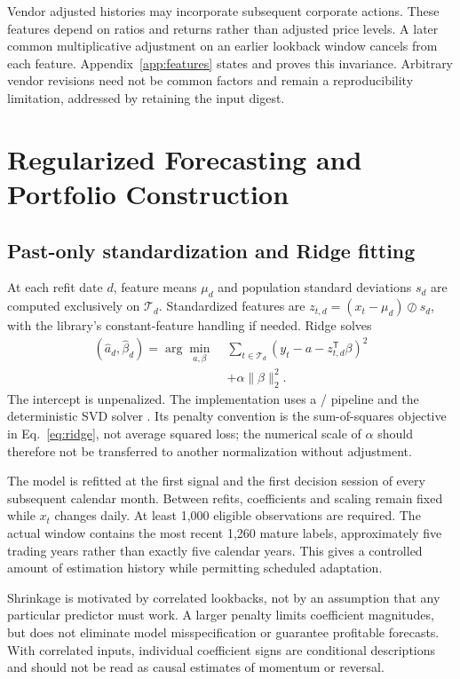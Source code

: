 Vendor adjusted histories may incorporate subsequent corporate actions. These features depend on ratios and returns rather than adjusted price levels. A later common multiplicative adjustment on an earlier lookback window cancels from each feature. Appendix~\ref{app:features} states and proves this invariance. Arbitrary vendor revisions need not be common factors and remain a reproducibility limitation, addressed by retaining the input digest.

\section{Regularized Forecasting and Portfolio Construction}
\label{sec:method}
\subsection{Past-only standardization and Ridge fitting}
At each refit date $d$, feature means $\mu_d$ and population standard deviations $s_d$ are computed exclusively on $\mathcal T_d$. Standardized features are $z_{t,d}=(x_t-\mu_d)\oslash s_d$, with the library's constant-feature handling if needed. Ridge solves
\begin{align}
 (\widehat a_d,\widehat\beta_d)
 =\arg\min_{a,\beta}\;&\sum_{t\in\mathcal T_d}
 (y_t-a-z_{t,d}^{\mathsf T}\beta)^2\nonumber\\
 &+\alpha\|\beta\|_2^2.
 \label{eq:ridge}
\end{align}
The intercept is unpenalized. The implementation uses a / pipeline and the deterministic SVD solver \citep{sklearnridge}. Its penalty convention is the sum-of-squares objective in Eq.~\eqref{eq:ridge}, not average squared loss; the numerical scale of $\alpha$ should therefore not be transferred to another normalization without adjustment.

The model is refitted at the first signal and the first decision session of every subsequent calendar month. Between refits, coefficients and scaling remain fixed while $x_t$ changes daily. At least 1,000 eligible observations are required. The actual window contains the most recent 1,260 mature labels, approximately five trading years rather than exactly five calendar years. This gives a controlled amount of estimation history while permitting scheduled adaptation.

Shrinkage is motivated by correlated lookbacks, not by an assumption that any particular predictor must work. A larger penalty limits coefficient magnitudes, but does not eliminate model misspecification or guarantee profitable forecasts. With correlated inputs, individual coefficient signs are conditional descriptions and should not be read as causal estimates of momentum or reversal.

